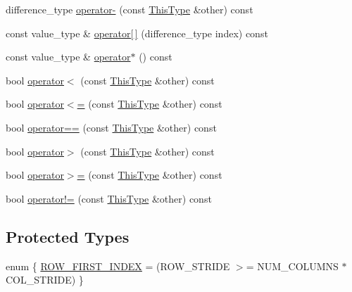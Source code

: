 \begin{DoxyCompactItemize}
\item 
difference\-\_\-type \hyperlink{classvct_fixed_stride_matrix_const_iterator_a44babcd63c37b91938861627b1e1e499}{operator-\/} (const \hyperlink{classvct_fixed_stride_matrix_const_iterator_a8c6ee7d655fb71d647506c3964a18e2c}{This\-Type} \&other) const 
\item 
const value\-\_\-type \& \hyperlink{classvct_fixed_stride_matrix_const_iterator_a2db82df75d7366f918ab32f2b4d28fc4}{operator\mbox{[}$\,$\mbox{]}} (difference\-\_\-type index) const 
\item 
const value\-\_\-type \& \hyperlink{classvct_fixed_stride_matrix_const_iterator_af79a4a3e90b5ff32a0c1ec1c7cbd7f9d}{operator$\ast$} () const 
\item 
bool \hyperlink{classvct_fixed_stride_matrix_const_iterator_a8e7df71e0b9cccdb29abbd135f253952}{operator$<$} (const \hyperlink{classvct_fixed_stride_matrix_const_iterator_a8c6ee7d655fb71d647506c3964a18e2c}{This\-Type} \&other) const 
\item 
bool \hyperlink{classvct_fixed_stride_matrix_const_iterator_ace3c857d9fcf35e574887f7d91565cab}{operator$<$=} (const \hyperlink{classvct_fixed_stride_matrix_const_iterator_a8c6ee7d655fb71d647506c3964a18e2c}{This\-Type} \&other) const 
\item 
bool \hyperlink{classvct_fixed_stride_matrix_const_iterator_a30720fc1aac7f4fa4303bb902d94fd5c}{operator==} (const \hyperlink{classvct_fixed_stride_matrix_const_iterator_a8c6ee7d655fb71d647506c3964a18e2c}{This\-Type} \&other) const 
\item 
bool \hyperlink{classvct_fixed_stride_matrix_const_iterator_a13d1e48d7d7d52c4cc05405cb0d01c9e}{operator$>$} (const \hyperlink{classvct_fixed_stride_matrix_const_iterator_a8c6ee7d655fb71d647506c3964a18e2c}{This\-Type} \&other) const 
\item 
bool \hyperlink{classvct_fixed_stride_matrix_const_iterator_a341561cf51af3633276865a544bcff70}{operator$>$=} (const \hyperlink{classvct_fixed_stride_matrix_const_iterator_a8c6ee7d655fb71d647506c3964a18e2c}{This\-Type} \&other) const 
\item 
bool \hyperlink{classvct_fixed_stride_matrix_const_iterator_a31551a9704867251d6fca5e369c63ab0}{operator!=} (const \hyperlink{classvct_fixed_stride_matrix_const_iterator_a8c6ee7d655fb71d647506c3964a18e2c}{This\-Type} \&other) const 
\end{DoxyCompactItemize}
\subsection*{Protected Types}
\begin{DoxyCompactItemize}
\item 
enum \{ \hyperlink{classvct_fixed_stride_matrix_const_iterator_a1ad91b24aad62d33ff762bd9e8cea3bcaa8508d448abd28db6d3a793f969deb27}{R\-O\-W\-\_\-\-F\-I\-R\-S\-T\-\_\-\-I\-N\-D\-E\-X} = (R\-O\-W\-\_\-\-S\-T\-R\-I\-D\-E $>$= N\-U\-M\-\_\-\-C\-O\-L\-U\-M\-N\-S $\ast$ C\-O\-L\-\_\-\-S\-T\-R\-I\-D\-E)
 \}
\end{DoxyCompactItemize}
